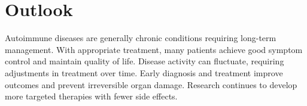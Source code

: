 \section{Outlook}
Autoimmune diseases are generally chronic conditions requiring long-term management. With appropriate treatment, many patients achieve good symptom control and maintain quality of life. Disease activity can fluctuate, requiring adjustments in treatment over time. Early diagnosis and treatment improve outcomes and prevent irreversible organ damage. Research continues to develop more targeted therapies with fewer side effects.
